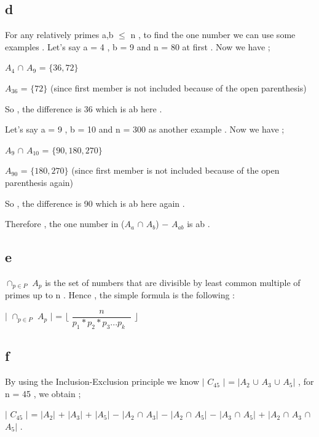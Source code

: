 \documentclass[12pt]{article}
\begin{document}
\subsection*{d}
\hspace{15px} For any relatively primes a,b $\leq$ n , to find the one number we can use some examples . Let's say a = 4 , b = 9 and n = 80 at first . Now we have ; \par 
\textit{$A_4$} $\cap$ \textit{$A_9$} = $\{36,72\}$  \par 
\textit{$A_{36}$} = $\{72\}$  (since first member is not included because of the open parenthesis) \par 
So , the difference is 36 which is ab here . \par 
Let's say a = 9 , b = 10 and n = 300 as another example . Now we have ; \par 
\textit{$A_9$} $\cap$ \textit{$A_{10}$} = $\{90,180,270\}$  \par 
\textit{$A_{90}$} = $\{180,270\}$  (since first member is not included because of the open parenthesis again) \par 
So , the difference is 90 which is ab here again . \par 
Therefore , the one number in  (\textit{$A_a$} $\cap$ \textit{$A_b$}) \textit{$-$} \textit{$A_{ab}$} is ab .
  
\subsection*{e}
\hspace{15px} $\cap_{p\in P}$ \textit{$A_p$} is the set of numbers that are divisible by least common multiple of primes up to n . Hence , the simple formula is the following : \par 
$|$ $\cap_{p\in P}$ \textit{$A_p$} $|$ = $\lfloor$ $\dfrac{n}{\textit{$p_1*p_2*p_3...p_k$ }}$ $\rfloor$
\subsection*{f}
\hspace{15px} By using the Inclusion-Exclusion principle we know $|$ \textit{$C_{45}$} $|$ = $|$\textit{$A_2$} $\cup$ \textit{$A_3$} $\cup$ \textit{$A_5$}$|$ , for n = 45 , we obtain ; \par 
$|$ \textit{$C_{45}$} $|$ = $|$\textit{$A_2$}$|$ + $|$\textit{$A_3$}$|$ + $|$\textit{$A_5$}$|$ \textit{$-$} $|$\textit{$A_2$} $\cap$ \textit{$A_3$}$|$ \textit{$-$} $|$\textit{$A_2$} $\cap$ \textit{$A_5$}$|$ \textit{$-$} $|$\textit{$A_3$} $\cap$ \textit{$A_5$}$|$ + $|$\textit{$A_2$} $\cap$ \textit{$A_3$} $\cap$ \textit{$A_5$}$|$ .
\end{document}
